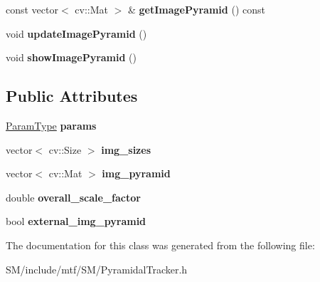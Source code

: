 \begin{DoxyCompactItemize}
\item 
\hypertarget{classPyramidalTracker_ab34b525201d1c198d61970e30fb42dcd}{const vector$<$ cv\-::\-Mat $>$ \& {\bfseries get\-Image\-Pyramid} () const }\label{classPyramidalTracker_ab34b525201d1c198d61970e30fb42dcd}

\item 
\hypertarget{classPyramidalTracker_acb3b94fba944385965e6cb9922ed8cdc}{void {\bfseries update\-Image\-Pyramid} ()}\label{classPyramidalTracker_acb3b94fba944385965e6cb9922ed8cdc}

\item 
\hypertarget{classPyramidalTracker_a57c8d07d540bc512219fa3712b4cf425}{void {\bfseries show\-Image\-Pyramid} ()}\label{classPyramidalTracker_a57c8d07d540bc512219fa3712b4cf425}

\end{DoxyCompactItemize}
\subsection*{Public Attributes}
\begin{DoxyCompactItemize}
\item 
\hypertarget{classPyramidalTracker_ad539f3b5294eba98920f3ab2d89b5828}{\hyperlink{structPyramidalParams}{Param\-Type} {\bfseries params}}\label{classPyramidalTracker_ad539f3b5294eba98920f3ab2d89b5828}

\item 
\hypertarget{classPyramidalTracker_af1263edad4daf17cf96fd3ba5765a189}{vector$<$ cv\-::\-Size $>$ {\bfseries img\-\_\-sizes}}\label{classPyramidalTracker_af1263edad4daf17cf96fd3ba5765a189}

\item 
\hypertarget{classPyramidalTracker_ad92cfa3efb1ff04aa872f0dfbb5c4988}{vector$<$ cv\-::\-Mat $>$ {\bfseries img\-\_\-pyramid}}\label{classPyramidalTracker_ad92cfa3efb1ff04aa872f0dfbb5c4988}

\item 
\hypertarget{classPyramidalTracker_a5a29badeda1cd06431b14299bfd930ef}{double {\bfseries overall\-\_\-scale\-\_\-factor}}\label{classPyramidalTracker_a5a29badeda1cd06431b14299bfd930ef}

\item 
\hypertarget{classPyramidalTracker_a3202154f22ef1846c47bcd13b5875057}{bool {\bfseries external\-\_\-img\-\_\-pyramid}}\label{classPyramidalTracker_a3202154f22ef1846c47bcd13b5875057}

\end{DoxyCompactItemize}


The documentation for this class was generated from the following file\-:\begin{DoxyCompactItemize}
\item 
S\-M/include/mtf/\-S\-M/Pyramidal\-Tracker.\-h\end{DoxyCompactItemize}
